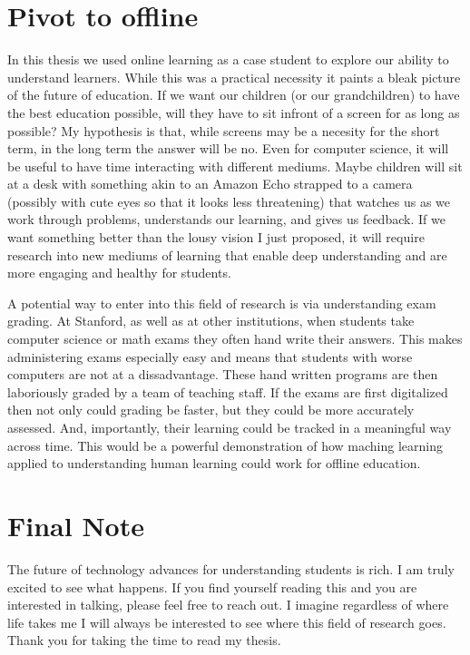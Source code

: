 \section{Pivot to offline}
In this thesis we used online learning as a case student to explore our ability to understand learners. While this was a practical necessity it paints a bleak picture of the future of education. If we want our children (or our grandchildren) to have the best education possible, will they have to sit infront of a screen for as long as possible? My hypothesis is that, while screens may be a necesity for the short term, in the long term the answer will be no. Even for computer science, it will be useful to have time interacting with different mediums. Maybe children will sit at a desk with something akin to an Amazon Echo strapped to a camera (possibly with cute eyes so that it looks less threatening) that watches us as we work through problems, understands our learning, and gives us feedback. If we want something better than the lousy vision I just proposed, it will require research into new mediums of learning that enable deep understanding and are more engaging and healthy for students.

A potential way to enter into this field of research is via understanding exam grading. At Stanford, as well as at other institutions, when students take computer science or math exams they often hand write their answers. This makes administering exams especially easy and means that students with worse computers are not at a dissadvantage. These hand written programs are then laboriously graded by a team of teaching staff. If the exams are first digitalized then not only could grading be faster, but they could be more accurately assessed. And, importantly, their learning could be tracked in a meaningful way across time. This would be a powerful demonstration of how maching learning applied to understanding human learning could work for offline education.

\section{Final Note}
The future of technology advances for understanding students is rich. I am truly excited to see what happens. If you find yourself reading this and you are interested in talking, please feel free to reach out. I imagine regardless of where life takes me I will always be interested to see where this field of research goes. Thank you for taking the time to read my thesis.